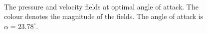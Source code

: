 \documentclass[12pt, a4paper]{article}
\begin{document}
\begin{figure}[htbp]
    \centering
     \\
    \caption{The pressure and velocity fields at optimal angle of attack. The colour denotes the magnitude of the fields. The angle of attack is $\alpha = 23.78^\circ$.}
    \label{fig_opt_angle}
\end{figure}
\end{document}
